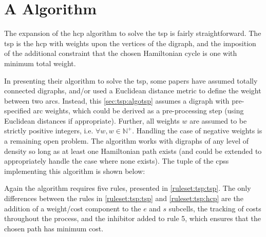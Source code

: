 \section{\label{sec:tsp:algotsp}A   Algorithm}

The expansion of the \gls{hcp} algorithm to solve the \gls{tsp} is fairly straightforward.  The \gls{tsp} is the \gls{hcp} with weights upon the vertices of the digraph, and the imposition of the additional constraint that the chosen Hamiltonian cycle is one with minimum total weight.  

In presenting their algorithm to solve the \gls{tsp}, some papers have assumed totally connected digraphs, and/or used a Euclidean distance metric to define the weight between two arcs.  Instead, this \cref{sec:tsp:algotsp} assumes a digraph with pre-specified arc weights, which could be derived as a pre-processing step (using Euclidean distances if appropriate).   Further, all weights \(w\) are assumed to be strictly positive integers, i.e. \(\forall w, w \in \mathbb{N}^+\).  Handling the case of negative weights is a remaining open problem.  The algorithm works with digraphs of any level of density so long as at least one Hamiltonian path exists (and could be extended to appropriately handle the case where none exists).  The tuple of the \glspl{cps} implementing this algorithm is shown below:


Again the algorithm requires five rules, presented in \cref{ruleset:tsp:tsp}.  The only differences between the rules in \cref{ruleset:tsp:tsp} and \cref{ruleset:tsp:hcp} are the addition of a weight/cost component to the \(e\) and \(s\) subcells, the tracking of costs throughout the process, and the inhibitor added to rule 5, which ensures that the chosen path has minimum cost.


